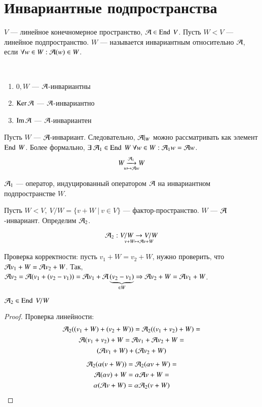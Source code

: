 \documentclass[main]{subfiles}
\begin{document}
\chapter{Инвариантные подпространства}

\begin{definition} 
    $V$ — линейное конечномерное пространство, $\mathcal{A}\in \operatorname{End} \ V$. Пусть $W  < V$ — линейное подпространство.
    $W$ — называется инвариантным относительно $\mathcal{A}$, если $\forall w\in W : \mathcal{A}(w) \in W$.
\end{definition}

\begin{propertylist}
    \
    \begin{enumerate}
        \item $0, W$ — $\mathcal{A}$-инвариантны
        \item $\operatorname{Ker} \mathcal{A}$ — $\mathcal{A}$-инвариантно
        \item $\operatorname{Im} \mathcal{A}$ — $\mathcal{A}$-инвариантен
    \end{enumerate}
\end{propertylist}



Пусть $W$ — $\mathcal{A}$-инвариант. Следовательно, $\mathcal{A}|_W$ можно рассматривать как элемент $\operatorname{End} \ W$.
Более формально, $\exists\  \mathcal{A}_1 \in \operatorname{End} \ W \ \forall w \in W : \mathcal{A}_1 w=\mathcal{A} w$.
\[\underset{w\mapsto \mathcal{A} w}{W\xrightarrow{\mathcal{A}_1} W}\]

$\mathcal{A}_1$  —  оператор, индуцированный оператором $\mathcal{A}$ на инвариантном подпространстве $W$.

$\text{Пусть } W < V,\ V/W = \{ v+W \ | \ v \in V\}$ — фактор-пространство.  $W$ — $\mathcal{A}$-инвариант.
Определим $\mathcal{A}_2$.

\[\mathcal{A}_2: \underset{v+W \mapsto \mathcal{A} v+W}{V/W \rightarrow V/W }\]

Проверка корректности: пусть $v_1+W = v_2+W$, нужно проверить, что $\mathcal{A} v_1+W=\mathcal{A} v_2 + W$. Так, $\mathcal{A} v_2= \mathcal{A}(v_1+(v_2-v_1))=\mathcal{A} v_1+ \mathcal{A}\underbrace{(v_2-v_1)}_{\in W} \Rightarrow
    \mathcal{A} v_2 + W= \mathcal{A} v_1+W$.

\begin{proposition} {}
    $\mathcal{A}_2 \in \operatorname{End} \ V/W$
\end{proposition}

\begin{proof}
    Проверка линейности:
    \begin{multline*}
        \mathcal{A}_2((v_1+W)+(v_2+W))= \mathcal{A}_2((v_1+v_2)+W)=\\
        \mathcal{A}(v_1+v_2)+W=  \mathcal{A} v_1+\mathcal{A} v_2+W=\\
        (\mathcal{A} v_1+W)+(\mathcal{A} v_2+W)
    \end{multline*}
    \begin{multline*}
        \mathcal{A}_2(\alpha(v+W))= \mathcal{A}_2(\alpha v+W)=\\
        \mathcal{A}(\alpha v)+W= \alpha \mathcal{A} v +W=\\
        \alpha(\mathcal{A} v +W) = \alpha \mathcal{A}_2(v+W)
    \end{multline*}
\end{proof}
\end{document}

